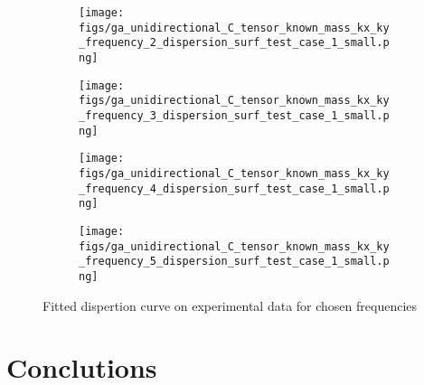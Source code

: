 \documentclass[runningheads]{llncs}
\begin{document}
\begin{figure}[ht]
	\begin{subfigure}{.5\textwidth}
		\centering
		\texttt{[image: figs/ga\_unidirectional\_C\_tensor\_known\_mass\_kx\_ky\_frequency\_2\_dispersion\_surf\_test\_case\_1\_small.png]}  
		\label{fig:sub-first}
	\end{subfigure}
	\begin{subfigure}{.5\textwidth}
		\centering
		\texttt{[image: figs/ga\_unidirectional\_C\_tensor\_known\_mass\_kx\_ky\_frequency\_3\_dispersion\_surf\_test\_case\_1\_small.png]}  
		\label{fig:sub-second}
	\end{subfigure}
	\newline
	\begin{subfigure}{.5\textwidth}
		\centering
		\texttt{[image: figs/ga\_unidirectional\_C\_tensor\_known\_mass\_kx\_ky\_frequency\_4\_dispersion\_surf\_test\_case\_1\_small.png]}  
		\label{fig:sub-first}
	\end{subfigure}
	\begin{subfigure}{.5\textwidth}
		\centering
		\texttt{[image: figs/ga\_unidirectional\_C\_tensor\_known\_mass\_kx\_ky\_frequency\_5\_dispersion\_surf\_test\_case\_1\_small.png]}  
		\label{fig:sub-second}
	\end{subfigure}
	\caption{Fitted dispertion curve on experimental data for chosen frequencies}
	\label{fig7}
\end{figure}

\section{Conclutions}


%
%
%
 
 
%
\end{document}
